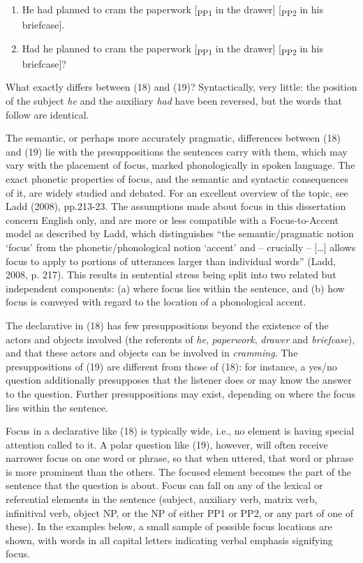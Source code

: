 \documentclass[11pt,oneside]{book}
\providecommand{\tightlist}{%
  \setlength{\itemsep}{0pt}\setlength{\parskip}{0pt}}
\begin{document}
\begin{enumerate}
\def\labelenumi{(\arabic{enumi})}
\setcounter{enumi}{17}
\tightlist
\item
  He had planned to cram the paperwork {[}\textsubscript{PP1} in the drawer{]} {[}\textsubscript{PP2} in his briefcase{]}.
\item
  Had he planned to cram the paperwork {[}\textsubscript{PP1} in the drawer{]} {[}\textsubscript{PP2} in his briefcase{]}?
\end{enumerate}

What exactly differs between (18) and (19)? Syntactically, very little: the position of the subject \emph{he} and the auxiliary \emph{had} have been reversed, but the words that follow are identical.

The semantic, or perhaps more accurately pragmatic, differences between (18) and (19) lie with the presuppositions the sentences carry with them, which may vary with the placement of focus, marked phonologically in spoken language. The exact phonetic properties of focus, and the semantic and syntactic consequences of it, are widely studied and debated. For an excellent overview of the topic, see Ladd (2008), pp.213-23. The assumptions made about focus in this dissertation concern English only, and are more or less compatible with a Focus-to-Accent model as described by Ladd, which distinguishes ``the semantic/pragmatic notion `focus' from the phonetic/phonological notion `accent' and -- crucially -- {[}\ldots{}{]} allows focus to apply to portions of utterances larger than individual words'' (Ladd, 2008, p. 217). This results in sentential stress being split into two related but independent components: (a) where focus lies within the sentence, and (b) how focus is conveyed with regard to the location of a phonological accent.

The declarative in (18) has few presuppositions beyond the existence of the actors and objects involved (the referents of \emph{he}, \emph{paperwork}, \emph{drawer} and \emph{briefcase}), and that these actors and objects can be involved in \emph{cramming}. The presuppositions of (19) are different from those of (18): for instance, a yes/no question additionally presupposes that the listener does or may know the answer to the question. Further presuppositions may exist, depending on where the focus lies within the sentence.

Focus in a declarative like (18) is typically wide, i.e., no element is having special attention called to it. A polar question like (19), however, will often receive narrower focus on one word or phrase, so that when uttered, that word or phrase is more prominent than the others. The focused element becomes the part of the sentence that the question is about. Focus can fall on any of the lexical or referential elements in the sentence (subject, auxiliary verb, matrix verb, infinitival verb, object NP, or the NP of either PP1 or PP2, or any part of one of these). In the examples below, a small sample of possible focus locations are shown, with words in all capital letters indicating verbal emphasis signifying focus.
\end{document}
